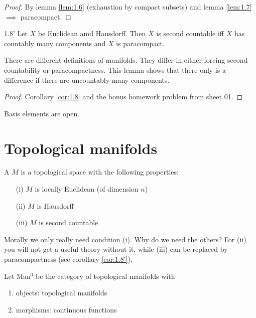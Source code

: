 \begin{proof}
    By lemma \ref{lem:1.6} (exhaustion by compact subsets) and lemma \ref{lem:1.7} \(\implies\) paracompact.
\end{proof}
\begin{customclr}{1.8'}\label{cor:1.8'} %
    Let \(X\) be Euclidean amd Hausdorff. Then \(X\) is second countable iff \(X\) has countably many components and \(X\) is paracompact.
\end{customclr}
\begin{remark}
    There are different definitions of manifolds. They differ in either forcing second countability or paracompactness. This lemma shows 
    that there only is a difference if there are uncountably many components.
\end{remark}

\begin{proof}
    Corollary \ref{cor:1.8} and the bonus homework problem from sheet 01.
\end{proof}

\begin{remark}
    Basis elements are open.
\end{remark}

\section{Topological manifolds}

\begin{definition*}
    A  \(M\) is a topological space with the following properties:
    \begin{enumerate}
        \item[(i)]   \(M\) is locally Euclidean (of dimension \(n\)) 
        \item[(ii)]  \(M\) is Hausdorff
        \item[(iii)] \(M\) is second countable 
    \end{enumerate}
\end{definition*}    

Morally we only really need condition (i). Why do we need the others? 
For (ii) you will not get a useful theory without it, while (iii) can be replaced by paracompactness (see corollary \ref{cor:1.8'}).

\begin{definition*}
    Let Man$^0$ be the category of topological manifolds with 
    \begin{enumerate}
        \item objects: topological manifolds 
        \item morphisms: continuous functions  
    \end{enumerate}
\end{definition*}

